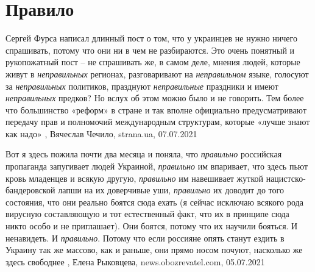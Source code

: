  
 
 
 
 
\chapter{Правило}

Сергей Фурса написал длинный пост о том, что у украинцев не нужно ничего
спрашивать, потому что они ни в чем не разбираются. Это очень понятный и
рукопожатный пост – не спрашивать же, в самом деле, мнения людей, которые живут
в \emph{неправильных} регионах, разговаривают на \emph{неправильном} языке, голосуют за
\emph{неправильных} политиков, празднуют \emph{неправильные} праздники и имеют \emph{неправильных}
предков?  Но вслух об этом можно было и не говорить. Тем более что большинство
«реформ» в стране и так вполне официально предусматривают передачу прав и
полномочий международным структурам, которые «лучше знают как надо»
, Вячеслав Чечило, strana.ua, 07.07.2021

Вот я здесь пожила почти два месяца и поняла, что \emph{правильно} российская
пропаганда запугивает людей Украиной, \emph{правильно} им впаривает, что здесь пьют
кровь младенцев и всякую другую, \emph{правильно} им навешивает жуткой
нацистско-бандеровской лапши на их доверчивые уши, \emph{правильно} их доводит до того
состояния, что они реально боятся сюда ехать (я сейчас исключаю всякого рода
вирусную составляющую и тот естественный факт, что их в принципе сюда никто
особо и не приглашает).
Они боятся, потому что их научили бояться. И ненавидеть. И \emph{правильно}. Потому
что если россияне опять станут ездить в Украину так же массово, как и раньше,
они прямо носом почуют, насколько же здесь свободнее
, 
Елена Рыковцева, news.obozrevatel.com, 05.07.2021
